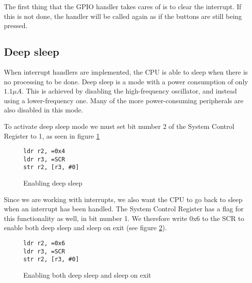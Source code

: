 The first thing that the GPIO handler takes cares of is to clear the interrupt. If this is not done, the handler will be called again as if the buttons are still being pressed.

\subsection{Deep sleep}
\label{subsec:dev_pros_deep_sleep}

When interrupt handlers are implemented, the CPU is able to sleep when there is no processing to be done.
Deep sleep is a mode with a power consumption of only $1.1 \mu A$.
This is achieved by disabling the high-frequency oscillator, and instead using a lower-frequency one.
Many of the more power-consuming peripherals are also disabled in this mode.

To activate deep sleep mode we must set bit number 2 of the System Control Register to 1, as seen in figure \ref{figure:deep_sleep}

\begin{figure}[h!]
\begin{lstlisting}
ldr r2, =0x4
ldr r3, =SCR
str r2, [r3, #0]
\end{lstlisting}
\caption{Enabling deep sleep}
\label{figure:deep_sleep}
\end{figure}

Since we are working with interrupts, we also want the CPU to go back to sleep when an interrupt has been handled.
The System Control Register has a flag for this functionality as well, in bit number 1.
We therefore write 0x6 to the SCR to enable both deep sleep and sleep on exit (see figure \ref{figure:deep_sleep_on_exit}).

\begin{figure}[h!]
\begin{lstlisting}
ldr r2, =0x6
ldr r3, =SCR
str r2, [r3, #0]
\end{lstlisting}
\caption{Enabling both deep sleep and sleep on exit}
\label{figure:deep_sleep_on_exit}
\end{figure}
